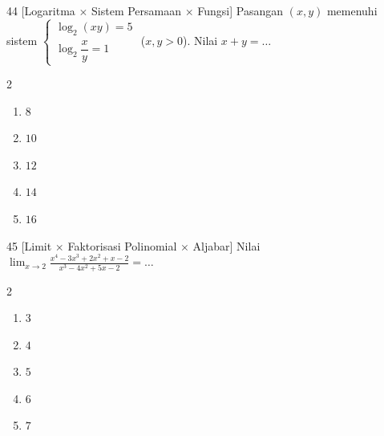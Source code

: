 \documentclass[11pt]{article}
\newenvironment{pilB}{%
  \par\smallskip\begin{multicols}{2}
  \begin{enumerate}[label=(\alph*),leftmargin=*,itemsep=1pt,topsep=3pt]}%
  {\end{enumerate}\end{multicols}}
\begin{document}
\begin{soal}{44 \normalfont\small[Logaritma $\times$ Sistem Persamaan $\times$ Fungsi]}
Pasangan $(x,y)$ memenuhi sistem $\begin{cases}\log_2(xy)=5\\\log_2\dfrac{x}{y}=1\end{cases}$ ($x,y>0$).
Nilai $x+y=\ldots$
\begin{pilB}
  \item $8$ \item $10$ \item $12$ \item $14$ \item $16$
\end{pilB}
\end{soal}

\begin{soal}{45 \normalfont\small[Limit $\times$ Faktorisasi Polinomial $\times$ Aljabar]}
Nilai $\displaystyle\lim_{x\to2}\frac{x^4-3x^3+2x^2+x-2}{x^3-4x^2+5x-2}=\ldots$
\begin{pilB}
  \item $3$ \item $4$ \item $5$ \item $6$ \item $7$
\end{pilB}
\end{soal}
\end{document}
